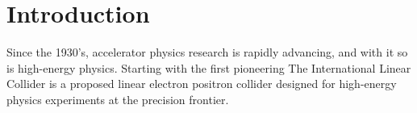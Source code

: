 \chapter{Introduction}
\label{Introduction}
Since the 1930's, accelerator physics research is rapidly advancing, and with it so is high-energy physics.
Starting with the first 
pioneering 
The International Linear Collider is a proposed linear electron positron collider designed for
high-energy physics experiments at the precision frontier.
